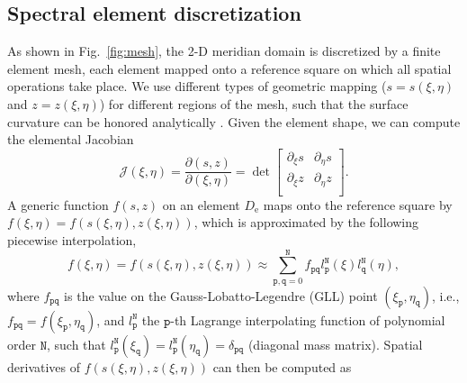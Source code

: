 \documentclass[extra,referee]{gji}
\begin{document}
\subsection{Spectral element discretization}
As shown in Fig.~\ref{fig:mesh}, the 2-D meridian domain is discretized 
by a finite element mesh, each element mapped onto a reference square 
on which all spatial operations take place. 
We use different types of geometric mapping 
($s=s\left(\xi,\eta\right)$ and $z=z\left(\xi,\eta\right)$)
for different regions of the mesh, such that the surface curvature can be
honored analytically \cite[]{nissen2007sem}.
Given the element shape, we can compute the elemental Jacobian
\begin{equation}
  \mathcal{J}\left(\xi,\eta\right)=\frac{\partial\left(s,z\right)}{\partial\left(\xi,\eta\right)}=\det 
  \begin{bmatrix}
    \partial_\xi s & \partial_\eta s \\
    \partial_\xi z & \partial_\eta z \\
  \end{bmatrix}.
  \label{eq:jacob}
\end{equation}
A generic function $f\left(s,z\right)$ on an element $D_\text{e}$ maps onto the 
reference square by $f\left(\xi,\eta\right)=f\left(s\left(\xi,\eta\right),z\left(\xi,\eta\right)\right)$, which is
approximated by the following piecewise interpolation,
\begin{equation}
  f\left(\xi,\eta\right)=f\left(s\left(\xi,\eta\right),z\left(\xi,\eta\right)\right) \approx 
  \sum_{\mathtt{p},\mathtt{q}=0}^{\mathtt{N}}
  f_{\mathtt{p}\mathtt{q}} l_{\mathtt{p}}^{\mathtt{N}}\left(\xi\right) 
  l_{\mathtt{q}}^{\mathtt{N}}\left(\eta\right),
\end{equation} 
where $f_{\mathtt{p}\mathtt{q}}$ is the value on the Gauss-Lobatto-Legendre
(GLL) point $\left(\xi_\mathtt{p},\eta_\mathtt{q}\right)$,
i.e., $f_{\mathtt{p}\mathtt{q}} = f\left(\xi_\mathtt{p},\eta_\mathtt{q}\right)$,
and $l_{\mathtt{p}}^{\mathtt{N}}$
the $\mathtt{p}$-th Lagrange interpolating function of polynomial order
$\mathtt{N}$, such that 
$l_{\mathtt{p}}^{\mathtt{N}}\left(\xi_\mathtt{q}\right)=
l_{\mathtt{p}}^{\mathtt{N}}\left(\eta_\mathtt{q}\right)=\delta_{\mathtt{p}\mathtt{q}}$ 
(diagonal mass matrix). 
Spatial derivatives of $f\left(s\left(\xi,\eta\right),z\left(\xi,\eta\right)\right)$ can then be computed as 
\end{document}
